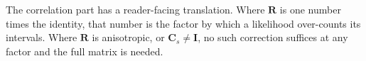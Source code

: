 The correlation part has a reader-facing translation. Where $\mathbf{R}$ is one number times the
identity, that number is the factor by which a likelihood over-counts its intervals. Where
$\mathbf{R}$ is anisotropic, or $\mathbf{C}_s\neq\mathbf{I}$, no such correction suffices at
any factor and the full matrix is needed.


